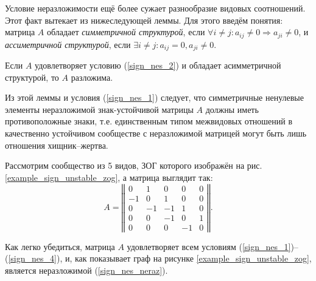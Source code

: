     Условие неразложимости ещё более сужает разнообразие видовых соотношений. Этот факт вытекает из нижеследующей леммы. Для этого введём понятия: матрица \(A\) обладает \textit{симметричной структурой}, если \(\forall i \neq j : a_{ij} \neq 0 \Rightarrow a_{ji} \neq 0 \), и \textit{ассиметричной структурой}, если \(\exists i \neq j : a_{ij} = 0, a_{ji} \neq 0 \).

    \begin{lemma}
        Если \(A\) удовлетворяет условию (\ref{sign_nes_2}) и обладает асимметричной структурой, то \(A\) разложима. \cite{svilog}
    \end{lemma}

    Из этой леммы и условия (\ref{sign_nes_1}) следует, что симметричные ненулевые элементы неразложимой знак-устойчивой матрицы \(A\) должны иметь противоположные знаки, т.е. единственным типом межвидовых отношений в качественно устойчивом сообществе с неразложимой матрицей могут быть лишь отношения хищник--жертва. 

    Рассмотрим сообщество из 5 видов, ЗОГ которого изображён на рис. \ref{example_sign_unstable_zog}, а матрица выглядит так:
    \begin{equation}
        A = \left\Vert \begin{matrix}
            0 & 1 & 0 & 0 & 0 \\
            -1& 0 & 1 & 0 & 0 \\
            0 &-1 &-1 & 1 & 0 \\
            0 & 0 &-1 & 0 & 1 \\
            0 & 0 & 0 &-1 & 0
        \end{matrix} \right\Vert.
    \end{equation}
    
    Как легко убедиться, матрица \(A\) удовлетворяет всем условиям (\ref{sign_nes_1})--(\ref{sign_nes_4}), и, как показывает граф на рисунке \ref{example_sign_unstable_zog}, является неразложимой (\ref{sign_nes_neraz}).

